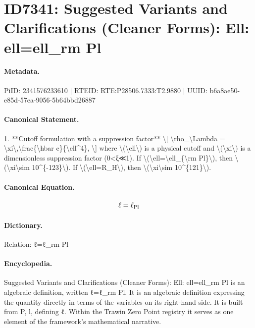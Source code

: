\section*{ID7341: Suggested Variants and Clarifications (Cleaner Forms): Ell: ell=ell\_rm Pl}
\paragraph{Metadata.}
PiID: 2341576233610 | RTEID: RTE:P28506.7333:T2.9880 | UUID: b6a8ae50-e85d-57ea-9056-5b64bbd26887

\paragraph{Canonical Statement.}
1. **Cutoff formulation with a suppression factor** \textbackslash{}[ \textbackslash{}rho\_\textbackslash{}Lambda = \textbackslash{}xi\textbackslash{},\textbackslash{}frac\{\textbackslash{}hbar c\}\{\textbackslash{}ell\textasciicircum{}4\}, \textbackslash{}] where \textbackslash{}(\textbackslash{}ell\textbackslash{}) is a physical cutoff and \textbackslash{}(\textbackslash{}xi\textbackslash{}) is a dimensionless suppression factor (0<ξ≪1). If \textbackslash{}(\textbackslash{}ell=\textbackslash{}ell\_\{\textbackslash{}rm Pl\}\textbackslash{}), then \textbackslash{}(\textbackslash{}xi\textbackslash{}sim 10\textasciicircum{}\{-123\}\textbackslash{}). If \textbackslash{}(\textbackslash{}ell=R\_H\textbackslash{}), then \textbackslash{}(\textbackslash{}xi\textbackslash{}sim 10\textasciicircum{}\{121\}\textbackslash{}).

\paragraph{Canonical Equation.}
\[
\ell=\ell_{\rm Pl}
\]

\paragraph{Dictionary.}
Relation: ℓ=ℓ\_rm Pl

\paragraph{Encyclopedia.}
Suggested Variants and Clarifications (Cleaner Forms): Ell: ell=ell\_rm Pl is an algebraic definition, written ℓ=ℓ\_rm Pl. It is an algebraic definition expressing the quantity directly in terms of the variables on its right-hand side. It is built from P, l, defining ℓ. Within the Trawin Zero Point registry it serves as one element of the framework's mathematical narrative.
